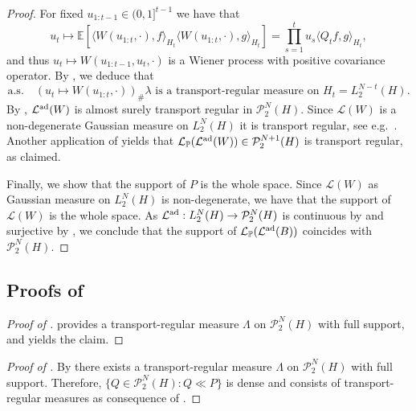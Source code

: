 \documentclass[a4paper]{amsart}
\numberwithin{theorem}{section}
\theoremstyle{definition}
\newcommand{\law}{\mathcal{L}}
\newcommand{\Pc}{\mathcal P}
\renewcommand{\H}{H}
\newcommand{\lawad}{\law^{\textup{ad}}}
\begin{document}
\begin{proof}
    For fixed $u_{1:t-1} \in (0,1]^{t-1}$ we have that
    \[
        u_t \mapsto \mathbb E[\langle W(u_{1:t},\cdot), f \rangle_{H_t} \langle W(u_{1:t},\cdot), g \rangle_{H_t}] = \prod_{s = 1}^t u_s \langle Q_tf, g \rangle_{H_t},
    \]
    and thus $u_t \mapsto W(u_{1:t-1},u_t,\cdot)$ is a Wiener process with positive covariance operator.
    By , we deduce that
    \begin{equation} \label{eq:TR.sheet.t}
        \text{a.s.}\quad 
        (u_t \mapsto W(u_{1:t},\cdot))_\# \lambda 
        \text{ is a transport-regular measure on } 
        H_t = L_2^{N-t}(H).
    \end{equation}
    By , $\lawad(W)$ is almost surely transport regular in $\Pc_2^N(H)$. 
    Since $\law(W)$ is a non-degenerate Gaussian measure on $L_2^N(H)$ it is transport regular, see e.g.\ \cite[Theorem 6.2.10]{AGS}.
    Another application of  yields that $\law_\mathbb P(\lawad(W)) \in \Pc_2^{N+1}(H)$
    is transport regular, as claimed.

    Finally, we show that the support of $P$ is the whole space.
    Since $\law(W)$ as Gaussian measure on $L^N_2(H)$ is non-degenerate, we have that the support of $\law(W)$ is the whole space.
    As $\lawad : L^N_2(\H) \to \Pc_2^N(H)$ is continuous by  and surjective by , we conclude that the support of $\law_\mathbb P(\lawad(B))$ coincides with $\Pc_2^N(H)$.
\end{proof}


\subsection{Proofs of }

\begin{proof}[Proof of ]
     provides a transport-regular measure $\Lambda$ on $\Pc_2^N(H)$ with full support, and yields the claim.
\end{proof}

\begin{proof}[Proof of ]
    By  there exists a transport-regular measure $\Lambda$ on $\Pc_2^N(H)$ with full support.
    Therefore, $\{ Q \in \Pc_2^N(H) : Q \ll P \}$ is dense and consists of transport-regular measures as consequence of .
\end{proof}
\end{document}
